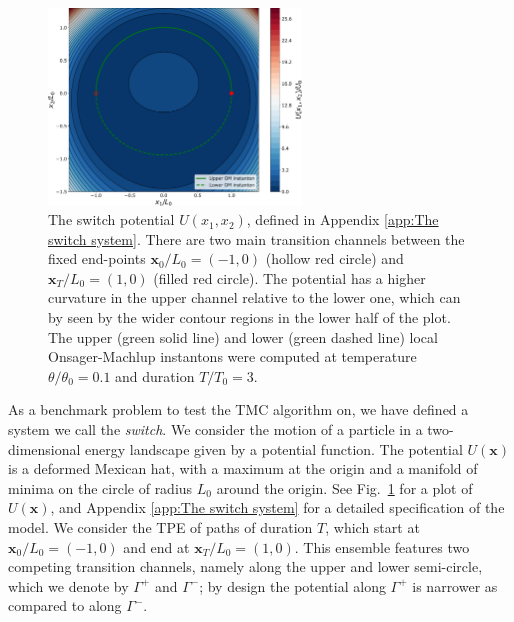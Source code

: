 \begin{figure}[t]
\includegraphics[width=0.6\textwidth]{figs_part1/mcmc/switch_potential}
\centering \caption{The switch potential $U(x_1, x_2)$, defined in Appendix \ref{app:The switch system}. There are two main transition channels between the fixed end-points $\mathbf{x}_0/L_0 = (-1, 0)$ (hollow red circle) and $\mathbf{x}_T/L_0 = (1, 0)$ (filled red circle). The potential has a higher curvature in the upper channel relative to the lower one, which can by seen by the wider contour regions in the lower half of the plot. The upper (green solid line) and lower (green dashed line) local Onsager-Machlup instantons were computed at temperature $\theta/\theta_0 = 0.1$ and duration $T/T_0 = 3$.}
\label{fig:switch potential} 
\end{figure}

As a benchmark problem to test the TMC algorithm on, we have defined a system we call the \textit{switch}. We consider the motion of a particle in a two-dimensional energy landscape given by a potential function. The potential $U(\mathbf{x})$ is a deformed Mexican hat, with a maximum at the origin and a manifold of minima on the circle of radius $L_0$ around the origin. See Fig.~\ref{fig:switch potential} for a plot of $U(\mathbf{x})$, and Appendix \ref{app:The switch system} for a detailed specification of the model. We consider the TPE of paths of duration $T$, which start at $\mathbf{x}_0/L_0 = (-1,0)$ and end at $\mathbf{x}_T/L_0 = (1,0)$. This ensemble features two competing transition channels, namely along the upper and lower semi-circle, which we denote by $\Gamma^{+}$ and $\Gamma^{-}$; by design the potential along $\Gamma^{+}$ is narrower as compared to along $\Gamma^{-}$.

